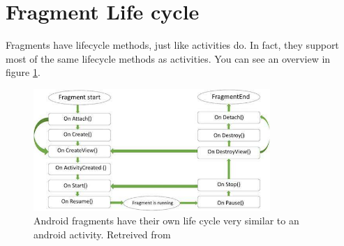 \section{Fragment Life cycle}
Fragments have lifecycle methods, just like activities do. In fact, they support most
of the same lifecycle methods as activities. You can see an overview in figure \ref{fig:fraglifecycle}.


\begin{figure}
	\centering
	\includegraphics[width=0.8\textwidth]{images/fragments/lifecycle.jpg}
	\caption{Android fragments have their own life cycle very similar to an android activity. Retreived from \cite{Point2017}}
	\label{fig:fraglifecycle}
\end{figure}

